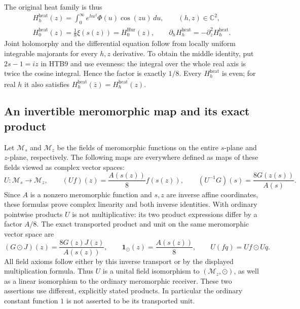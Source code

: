 The original heat family is thus
\begin{equation}\tag{HTB10}
\begin{gathered}
 H_h^{\mathrm{heat}}(z)=\int_0^{\infty}e^{h u^2}\Phi(u)\cos(zu)\,du,
 \qquad (h,z)\in\mathbb C^2,\\
 H_0^{\mathrm{heat}}(z)=\frac18\xi(s(z))=H_0^{\mathrm{Hur}}(z),\qquad
 \partial_h H_h^{\mathrm{heat}}=-\partial_z^2 H_h^{\mathrm{heat}}.
\end{gathered}
\end{equation}
Joint holomorphy and the differential equation follow from locally
uniform integrable majorants for every $h,z$ derivative. To obtain the
middle identity, put $2s-1=iz$ in HTB9 and use evenness: the integral
over the whole real axis is twice the cosine integral. Hence the factor
is exactly $1/8$. Every $H_h^{\mathrm{heat}}$ is even; for real $h$ it
also satisfies $H_h^{\mathrm{heat}}(\bar z)
=\overline{H_h^{\mathrm{heat}}(z)}$.

\subsection{An invertible meromorphic map and its exact product}

Let $\mathcal M_s$ and $\mathcal M_z$ be the fields of meromorphic
functions on the entire $s$-plane and $z$-plane, respectively. The
following maps are everywhere defined as maps of these fields viewed
as complex vector spaces:
\begin{equation}\tag{HTB11}
 U:\mathcal M_s\longrightarrow\mathcal M_z,\qquad
 (Uf)(z)=\frac{A(s(z))}{8}f(s(z)),\qquad
 (U^{-1}G)(s)=\frac{8G(z(s))}{A(s)}.
\end{equation}
Since $A$ is a nonzero meromorphic function and $s,z$ are inverse affine
coordinates, these formulas prove complex linearity and both inverse
identities. With ordinary pointwise products $U$ is not multiplicative:
its two product expressions differ by a factor $A/8$. The exact
transported product and unit on the same meromorphic vector space are
\begin{equation}\tag{HTB12}
 (G\mathbin{\odot}J)(z)=\frac{8G(z)J(z)}{A(s(z))},\qquad
 \mathbf 1_{\odot}(z)=\frac{A(s(z))}{8},\qquad
 U(fq)=Uf\mathbin{\odot}Uq.
\end{equation}
All field axioms follow either by this inverse transport or by the
displayed multiplication formula. Thus $U$ is a unital field
isomorphism to $(\mathcal M_z,\odot)$, as well as a linear isomorphism
to the ordinary meromorphic receiver. These two assertions use
different, explicitly stated products. In particular the ordinary
constant function $1$ is not asserted to be its transported unit.

